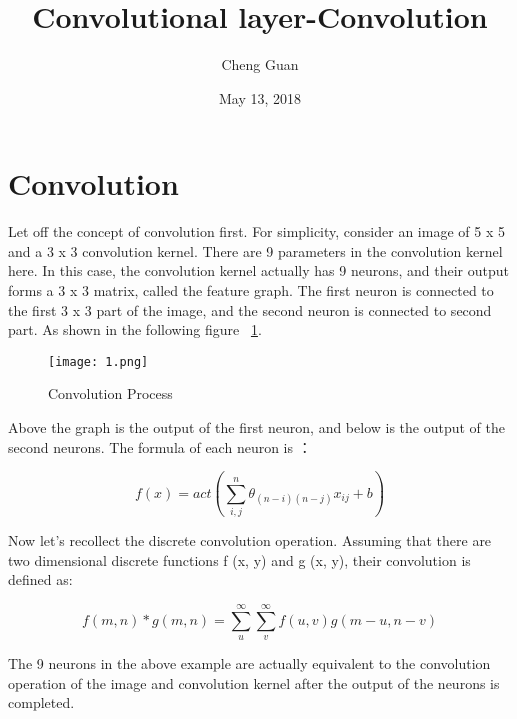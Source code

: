 \documentclass[a4paper,twocolumn]{article}
\title{Convolutional layer-Convolution}
\author{Cheng Guan}
\date{May 13, 2018}
\begin{document}
\maketitle
\balance
\section{Convolution}
 Let off the concept of convolution first. For simplicity,
consider an image of 5 x 5 and a 3 x 3 convolution kernel.
There are 9 parameters in the convolution kernel here.
In this case, the convolution kernel actually has 9 neurons,
and their output forms a 3 x 3 matrix, called the feature graph.
The first neuron is connected to the first 3 x 3 part of the image, and the second neuron is connected to second part.
As shown in the following figure ~\ref{fig1}.

\begin{figure}[htbp]
\centering
\texttt{[image: 1.png]}
\caption{Convolution Process}
\label{fig1}
\end{figure}

Above the graph is the output of the first neuron, and below is the output of the second neurons.
The formula of each neuron is ：\\
\begin{center}
    \begin{equation}
     f(x)=act(\sum_{i,j}^n\theta_{(n-i)(n-j)}x_{ij}+b)
    \end{equation}
\end{center}

Now let's recollect the discrete convolution operation.
Assuming that there are two dimensional discrete functions f (x, y) and g (x, y),
their convolution is defined as:\\
\begin{center}
    \begin{equation}
     f(m,n)*g(m,n)=\sum_u^{\infty}\sum_v^{\infty}f(u,v)g(m-u,n-v)
    \end{equation}
\end{center}
The 9 neurons in the above example are actually equivalent to the convolution operation of the image and convolution kernel
after the output of the neurons is completed.\cite{test2}


\end{document}
